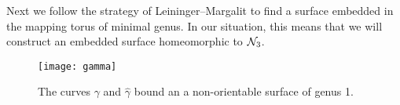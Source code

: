 Next we follow the strategy of Leininger--Margalit \cite{leininger2013number} to find a surface embedded in the mapping torus of minimal genus.  In our situation, this means that we will construct an embedded surface homeomorphic to $\mathcal{N}_3$.


\begin{figure}[t]
    \centering
    \texttt{[image: gamma]}
    \caption{The curves $\gamma$ and $\widehat{\gamma}$ bound an a non-orientable surface of genus 1.}
    \label{fig:gammacurves}
\end{figure}


